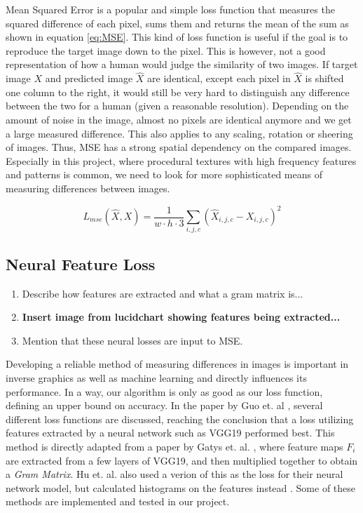 Mean Squared Error is a popular and simple loss function that measures the squared difference of each pixel, sums them and returns the mean of the sum as shown in equation \ref{eq:MSE}. This kind of loss function is useful if the goal is to reproduce the target image down to the pixel. This is however, not a good representation of how a human would judge the similarity of two images. If target image $X$ and predicted image $\hat{X}$ are identical, except each pixel in $\hat{X}$ is shifted one column to the right, it would still be very hard to distinguish any difference between the two for a human (given a reasonable resolution). Depending on the amount of noise in the image, almost no pixels are identical anymore and we get a large measured difference. This also applies to any scaling, rotation or sheering of images. Thus, MSE has a strong spatial dependency on the compared images. Especially in this project, where procedural textures with high frequency features and patterns is common, we need to look for more sophisticated means of measuring differences between images.

\begin{equation}\label{eq:MSE}
    L_{mse}(\hat{X}, X) = \frac{1}{w\cdot h\cdot 3}\sum_{i,j,c} (\hat{X}_{i,j,c} - X_{i,j,c})^2
\end{equation}

\subsection{Neural Feature Loss}

\begin{enumerate}
    \item Describe how features are extracted and what a gram matrix is...
    \item \textbf{Insert image from lucidchart showing features being extracted...}
    \item Mention that these neural losses are input to MSE.
\end{enumerate}

Developing a reliable method of measuring differences in images is important in inverse graphics as well as machine learning and directly influences its performance. In a way, our algorithm is only as good as our loss function, defining an upper bound on accuracy. In the paper by Guo et. al \cite{guo_2019_a}, several different loss functions are discussed, reaching the conclusion that a loss utilizing features extracted by a neural network such as VGG19 \cite{simonyan_2015_very} performed best. This method is directly adapted from a paper by Gatys et. al. \cite{gatys_2015_texture}, where feature maps $F_i$ are extracted from a few layers of VGG19, and then multiplied together to obtain a \textit{Gram Matrix}. Hu et. al. also used a verion of this as the loss for their neural network model, but calculated histograms on the features instead \cite{hu_2019_a}. Some of these methods are implemented and tested in our project.

